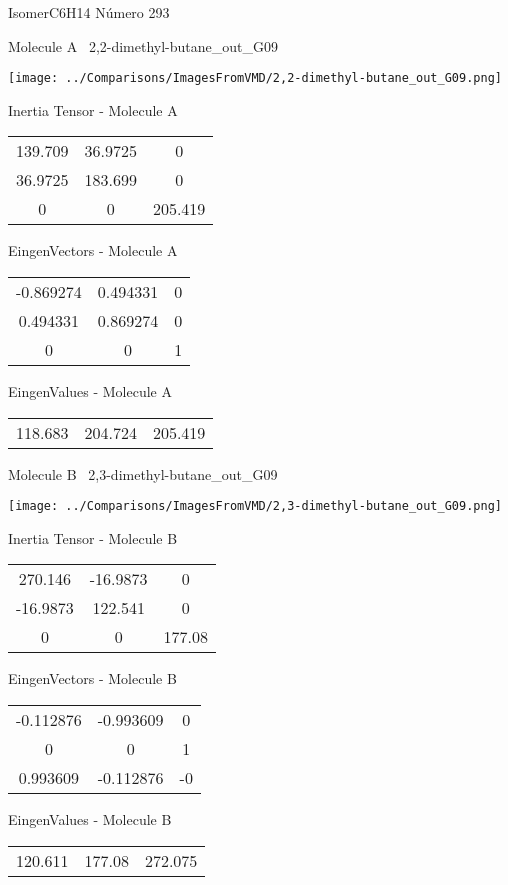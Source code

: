 \vtab[-3cm]
\begin{center}
{\large IsomerC6H14 \tab Número 293}
\end{center}
\begin{multicols}{2}
\begin{center}

Molecule A \
2,2-dimethyl-butane\_out\_G09

\texttt{[image: ../Comparisons/ImagesFromVMD/2,2-dimethyl-butane\_out\_G09.png]}

Inertia Tensor - Molecule A \\
\begin{tabular}{|c c c|}
139.709	 & 	36.9725	 & 	0	 \\
36.9725	 & 	183.699	 & 	0	 \\
0	 & 	0	 & 	205.419
\end{tabular}

\vtab
 EingenVectors - Molecule A     \\
\begin{tabular}{|c c c|}
-0.869274	 & 	0.494331	 & 	0	 \\
0.494331	 & 	0.869274	 & 	0	 \\
0	 & 	0	 & 	1
\end{tabular}

\vtab
 EingenValues - Molecule A     \\
\begin{tabular}{|c c c|}
118.683	 & 	204.724	 & 	205.419	 \\
\end{tabular}
\columnbreak

Molecule B \
2,3-dimethyl-butane\_out\_G09

\texttt{[image: ../Comparisons/ImagesFromVMD/2,3-dimethyl-butane\_out\_G09.png]}

Inertia Tensor - Molecule B \\
\begin{tabular}{|c c c|}
270.146	 & 	-16.9873	 & 	0	 \\
-16.9873	 & 	122.541	 & 	0	 \\
0	 & 	0	 & 	177.08
\end{tabular}

\vtab
 EingenVectors - Molecule B     \\
\begin{tabular}{|c c c|}
-0.112876	 & 	-0.993609	 & 	0	 \\
0	 & 	0	 & 	1	 \\
0.993609	 & 	-0.112876	 & 	-0
\end{tabular}

\vtab
 EingenValues - Molecule B     \\
\begin{tabular}{|c c c|}
120.611	 & 	177.08	 & 	272.075	 \\
\end{tabular}

\end{center}
\end{multicols}


